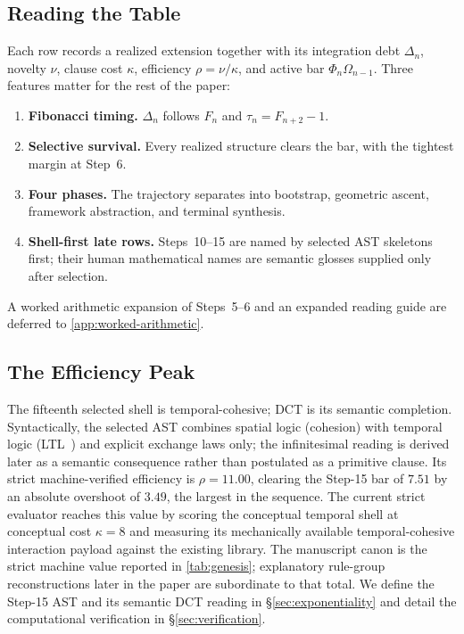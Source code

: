 \documentclass[11pt,a4paper]{article}
\theoremstyle{plain}
\theoremstyle{definition}
\theoremstyle{remark}
\begin{document}
\subsection{Reading the Table}

Each row records a realized extension together with its integration debt $\Delta_n$, novelty $\nu$, clause cost $\kappa$, efficiency $\rho=\nu/\kappa$, and active bar $\Phi_n\Omega_{n-1}$.
Three features matter for the rest of the paper:
\begin{enumerate}[nosep]
    \item \textbf{Fibonacci timing.} $\Delta_n$ follows $F_n$ and $\tau_n=F_{n+2}-1$.
    \item \textbf{Selective survival.} Every realized structure clears the bar, with the tightest margin at Step~6.
    \item \textbf{Four phases.} The trajectory separates into bootstrap, geometric ascent, framework abstraction, and terminal synthesis.
    \item \textbf{Shell-first late rows.} Steps~10--15 are named by selected AST skeletons first; their human mathematical names are semantic glosses supplied only after selection.
\end{enumerate}
A worked arithmetic expansion of Steps~5--6 and an expanded reading guide are deferred to \cref{app:worked-arithmetic}.

\subsection{The Efficiency Peak}

The fifteenth selected shell is temporal-cohesive; DCT is its semantic completion.
Syntactically, the selected AST combines spatial logic (cohesion) with temporal logic (LTL~\cite{nakano}) and explicit exchange laws only; the infinitesimal reading is derived later as a semantic consequence rather than postulated as a primitive clause.
Its strict machine-verified efficiency is $\rho = 11.00$, clearing the Step-15 bar of $7.51$ by an absolute overshoot of $3.49$, the largest in the sequence.
The current strict evaluator reaches this value by scoring the conceptual temporal shell at conceptual cost $\kappa = 8$ and measuring its mechanically available temporal-cohesive interaction payload against the existing library.
The manuscript canon is the strict machine value reported in \cref{tab:genesis}; explanatory rule-group reconstructions later in the paper are subordinate to that total.
We define the Step-15 AST and its semantic DCT reading in \S\ref{sec:exponentiality} and detail the computational verification in \S\ref{sec:verification}.
\end{document}
